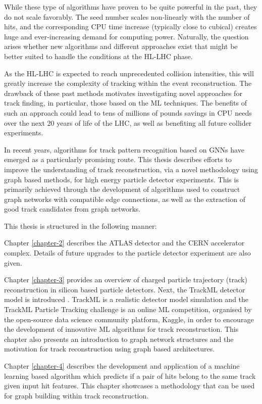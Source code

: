 While these type of algorithms have proven to be quite powerful in the past, they do not scale favorably. The seed number scales non-linearly with the number of hits, and the corresponding CPU time increase (typically close to cubical) creates huge and ever-increasing demand for computing power. Naturally, the question arises whether new algorithms and different approaches exist that might be better suited to handle the conditions at the \ac{HL-LHC} phase.

As the \ac{HL-LHC} is expected to reach unprecedented collision intensities, this will greatly increase the complexity of tracking within the event reconstruction. The drawback of these past methods motivates investigating novel approaches for track finding, in particular, those based on the \ac{ML} techniques. The benefits of such an approach could lead to tens of millions of pounds savings in CPU needs over the next 20 years of life of the \ac{LHC}, as well as benefiting all future collider experiments.

In recent years, algorithms for track pattern recognition based on \ac{GNNs} have emerged as a particularly promising route. This thesis describes efforts to improve the understanding of track reconstruction, via a novel methodology using graph based methods, for high energy particle detector experiments. This is primarily achieved through the development of algorithms used to construct graph networks with compatible edge connections, as well as the extraction of good track candidates from graph networks. 

This thesis is structured in the following manner:

Chapter \ref{chapter-2} describes the ATLAS detector and the CERN accelerator complex. Details of future upgrades to the particle detector experiment are also given.

Chapter \ref{chapter-3} provides an overview of charged particle trajectory (track) reconstruction in silicon based particle detectors. Next, the TrackML detector model is introduced \cite{kaggle-trackml}. TrackML is a realistic detector model simulation and the TrackML Particle Tracking challenge is an online \ac{ML} competition, organised by the open-source data science community platform, Kaggle, in order to encourage the development of innovative \ac{ML} algorithms for track reconstruction. This chapter also presents an introduction to graph network structures and the motivation for track reconstruction using graph based architectures.

Chapter \ref{chapter-4} describes the development and application of a machine learning based algorithm which predicts if a pair of hits belong to the same track given input hit features. This chapter showcases a methodology that can be used for graph building within track reconstruction.

